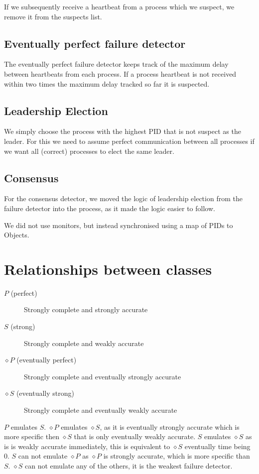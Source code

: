 \documentclass[11pt]{amsart}
\begin{document}
If we subsequently receive a heartbeat from a process which we suspect, we remove
it from the suspects list.

\subsection{Eventually perfect failure detector}

The eventually perfect failure detector keeps track of the maximum delay
between heartbeats from each process. If a process heartbeat is not received
within two times the maximum delay tracked so far it is suspected.

\subsection{Leadership Election}

We simply choose the process with the highest PID that is not suspect as the leader.
For this we need to assume perfect communication between all processes if we want
all (correct) processes to elect the same leader.

\subsection{Consensus}

For the consensus detector, we moved the logic of leadership election from the failure detector
into the process, as it made the logic easier to follow.

We did not use monitors, but instead synchronised using a map of PIDs to Objects.

\section{Relationships between classes}

\begin{description}
	\item[$P$ (perfect)] Strongly complete and strongly accurate
	\item[$S$ (strong)] Strongly complete and weakly accurate
	\item[$\diamond P$ (eventually perfect)] Strongly complete and eventually strongly accurate
	\item[$\diamond S$ (eventually strong)] Strongly complete and eventually weakly accurate
\end{description}

$P$ emulates $S$. 
$\diamond P$ emulates $\diamond S$, as it is eventually strongly accurate which
is more specific then $\diamond S$ that is only eventually weakly accurate.
$S$ emulates $\diamond S$ as is is weakly accurate immediately, this is equivalent to $\diamond S$ eventually time being 0.
$S$ can not emulate $\diamond P$ as $\diamond P$ is strongly accurate, which is more specific than $S$.
$\diamond S$ can not emulate any of the others, it is the weakest failure detector.
\end{document}
